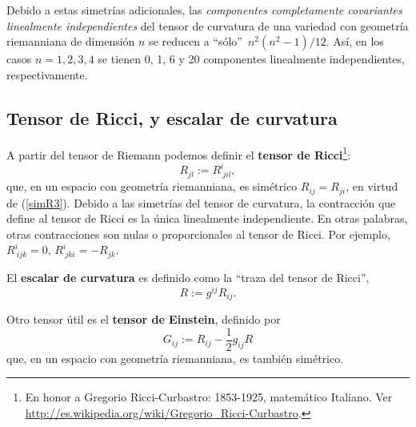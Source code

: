 Debido a estas simetrías adicionales, las \textit{componentes completamente covariantes linealmente independientes} del tensor de curvatura de una variedad con geometría riemanniana de dimensión $n$ se reducen a ``sólo''\, $n^2(n^2-1)/12$. Así, en los casos $n=1,2,3,4$ se tienen 0, 1, 6 y 20 componentes linealmente independientes, respectivamente.

\subsection{Tensor de Ricci, y escalar de curvatura}
A partir del tensor de Riemann podemos definir el \textbf{tensor de Ricci}\footnote{En honor a Gregorio Ricci-Curbastro: 1853-1925, matemático Italiano. Ver \url{http://es.wikipedia.org/wiki/Gregorio_Ricci-Curbastro}.}:
\begin{equation}
R_{jl}:=R_{\ jil}^i,
\end{equation}
que, en un espacio con geometría riemanniana, es simétrico $R_{ij}=R_{ji}$, en virtud de (\ref{simR3}). Debido a las simetrías del tensor de curvatura, la contracción que define al tensor de Ricci es la única linealmente independiente. En otras palabras, otras contracciones son nulas o proporcionales al tensor de Ricci. Por ejemplo, $R^i_{\ ijk}=0$, $R^i_{\ jki}=-R_{jk}$.

El \textbf{escalar de curvatura} es definido como la ``traza del tensor de
Ricci'',
\begin{equation}
R :=g^{ij}R_{ij}.
\end{equation}

Otro tensor útil es el \textbf{tensor de Einstein}, definido por
\begin{equation}
G_{ij} :=R_{ij}-\frac{1}{2}g_{ij}R
\end{equation}
que, en un espacio con geometría riemanniana, es también simétrico.




